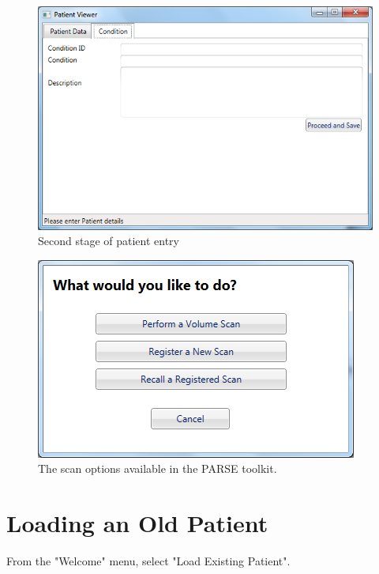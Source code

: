 \begin{figure}[!h]
\begin{center}
\includegraphics[scale=0.6]{images/details2}
\end{center}
\caption{Second stage of patient entry}
\label{second stage of patient entry}
\end{figure}


\begin{figure}[h]
\begin{center}
\includegraphics[scale=0.6]{images/scans}
\end{center}
\caption{The scan options available in the PARSE toolkit.}
\label{scans}
\end{figure}

\section*{Loading an Old Patient}
From the "Welcome" menu, select "Load Existing Patient".\\

